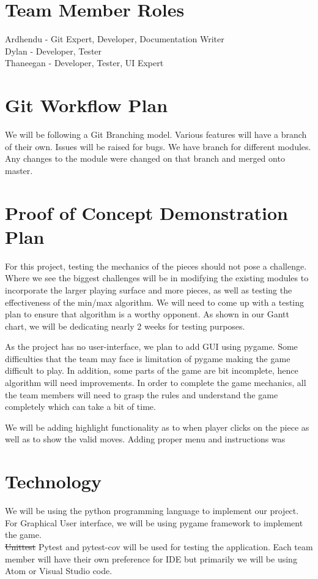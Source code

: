 \documentclass{article}
\begin{document}
\section{Team Member Roles}
Ardhendu - Git Expert, Developer, {\color{blue} Documentation Writer}\\ 
Dylan - Developer, Tester \\
Thaneegan - Developer, Tester, UI Expert

\section{Git Workflow Plan}
We will be following a Git Branching model. Various features will have a branch of their own. Issues will be raised for bugs.{\color{blue} We have branch for different modules. Any changes to the module were changed on that branch and merged onto master.}

\section{Proof of Concept Demonstration Plan}
For this project, testing the mechanics of the pieces should not pose a challenge. Where we see the biggest challenges will be in modifying the existing modules to incorporate the larger playing surface and more pieces, as well as testing the effectiveness of the min/max algorithm. We will need to come up with a testing plan to ensure that algorithm is a worthy opponent. As shown in our Gantt chart, we will be dedicating nearly 2 weeks for testing purposes.

As the project has no user-interface, we plan to add GUI using pygame. Some difficulties that the team may face is limitation of pygame making the game difficult to play.
In addition, some parts of the game are bit incomplete, hence algorithm will need improvements. In order to complete the game mechanics, all the team members will need to grasp the rules and understand the game completely which can take a bit of time.

{\color{blue} We will be adding highlight functionality as to when player clicks on the piece as well as to show the valid moves. Adding proper menu and instructions was }

\section{Technology}
We will be using the python programming language to implement our project. \\
For Graphical User interface, we will be using pygame framework to implement the game. \\
\st{Unittest} {\color{blue} Pytest and pytest-cov} will be used for testing the application.
Each team member will have their own preference for IDE but primarily we will be using Atom or Visual Studio {\color{blue} code}.
\end{document}
